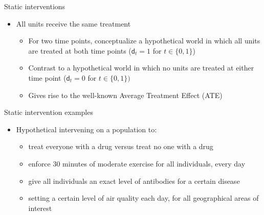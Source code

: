 \documentclass[
  10pt,
  ignorenonframetext,
]{beamer}
\providecommand{\tightlist}{%
  \setlength{\itemsep}{0pt}\setlength{\parskip}{0pt}}\usepackage{longtable,booktabs,array}
\begin{document}
\begin{frame}{Static interventions}
\protect\hypertarget{static-interventions}{}
\begin{itemize}
\item
  All units receive the same treatment

  \begin{itemize}
  \item
    For two time points, conceptualize a hypothetical world in which all
    units are treated at both time points (\(\mathsf{d}_t = 1\) for
    \(t \in \{0, 1\}\))
  \item
    Contrast to a hypothetical world in which no units are treated at
    either time point (\(\mathsf{d}_t = 0\) for \(t \in \{0, 1\})\)
  \item
    Gives rise to the well-known Average Treatment Effect (ATE)
  \end{itemize}
\end{itemize}
\end{frame}

\begin{frame}{Static intervention examples}
\protect\hypertarget{static-intervention-examples}{}
\begin{itemize}
\tightlist
\item
  Hypothetical intervening on a population to:

  \begin{itemize}
  \tightlist
  \item
    treat everyone with a drug versus treat no one with a drug
  \item
    enforce 30 minutes of moderate exercise for all individuals, every
    day
  \item
    give all individuals an exact level of antibodies for a certain
    disease
  \item
    setting a certain level of air quality each day, for all
    geographical areas of interest
  \end{itemize}
\end{itemize}
\end{frame}
\end{document}
